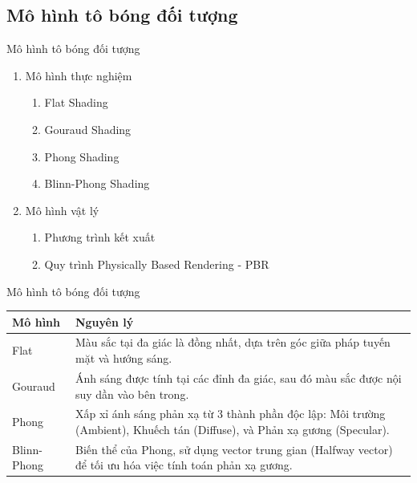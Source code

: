 \documentclass[11pt, aspectratio=169]{beamer}
\begin{document}
\subsection{Mô hình tô bóng đối tượng}
\begin{frame}{Mô hình tô bóng đối tượng}
	\begin{enumerate}
		\item Mô hình thực nghiệm
		\begin{enumerate}
			\item Flat Shading
			\item Gouraud Shading
			\item Phong Shading
			\item Blinn-Phong Shading
		\end{enumerate}
		\item Mô hình vật lý
		\begin{enumerate}
			\item Phương trình kết xuất
			\item Quy trình Physically Based Rendering - PBR
		\end{enumerate}
	\end{enumerate}
\end{frame}

\begin{frame}{Mô hình tô bóng đối tượng}
	\begin{table}[h]
		\centering
		\begin{tabular}{|l|p{10cm}|}
			\hline
			\textbf{Mô hình} & \textbf{Nguyên lý} \\ \hline
			Flat & Màu sắc tại đa giác là đồng nhất, dựa trên góc giữa pháp tuyến mặt và hướng sáng. \\ \hline
			Gouraud & Ánh sáng được tính tại các đỉnh đa giác, sau đó màu sắc được nội suy dần vào bên trong. \\ \hline
			Phong & Xấp xỉ ánh sáng phản xạ từ 3 thành phần độc lập: Môi trường (Ambient), Khuếch tán (Diffuse), và Phản xạ gương (Specular). \\ \hline
			Blinn-Phong & Biến thể của Phong, sử dụng vector trung gian (Halfway vector) để tối ưu hóa việc tính toán phản xạ gương. \\ \hline
		\end{tabular}
	\end{table}
\end{frame}
\end{document}
